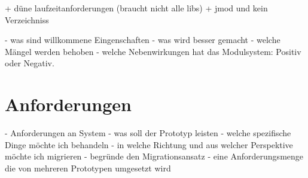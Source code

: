 + düne laufzeitanforderungen (braucht nicht alle libs)
+ jmod und kein Verzeichniss 

	- was sind willkommene Eingenschaften 
	- was wird besser gemacht 
	- welche Mängel werden behoben 
	- welche Nebenwirkungen hat das Modulsystem: Positiv oder Negativ. 

\section{Anforderungen} \label{sec:anforderungen}
- Anforderungen an System 
	- was soll der Prototyp leisten 
	- welche spezifische Dinge möchte ich behandeln 
	- in welche Richtung und aus welcher Perspektive möchte ich migrieren 
	- begründe den Migrationsansatz 
	- eine Anforderungsmenge die von mehreren Prototypen umgesetzt wird 



